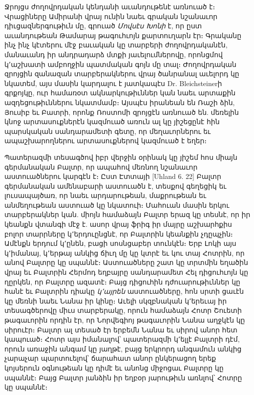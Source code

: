\documentclass{article}
\begin{document}
{Ջրոյցս ժողովրդական կենդանի աւանդութենէ առնուած է։ Վրացիները Ամիրանի վրայ ունին նաեւ գրական նշանաւոր դիւցազներգութիւն մը, գրուած \emph{Մովսէս Խոնի} է, որ ըստ աւանդութեան Թամարայ թագուհւոյն քարտուղարն էր։ Գրականը ինչ ինչ կէտերու մէջ բաւական կը տարբերի ժողովրդականէն, մանաւանդ իր անդրադարձ մտքի յաւելումներովը, որոնցմով կ՚աշխատի ամբողջին պատմական գոյն մը տալ։ Ժողովրդական զրոյցին զանազան տարբերակներու վրայ ծանրանալ աւելորդ կը նկատեմ, այս մասին կարդալու է յատկապէս Dr. Bleichsteinerի գրքոյկը, ուր համառօտ ակնարկութիւններ կան նաեւ արտաքին ազդեցութիւններու նկատմամբ։ Այսպէս իրանեան են Ռաշի ձին, Յուսիբ եւ Բատրի, որոնք Ռոստոմի զրոյցէն առնուած են. մեռելին կնոջ արտասուքներէն կազմուած առուն ալ կը յիշեցընէ հին պարսկական սանդարամետի գետը, որ մեղաւորներու եւ ապաշխարողներու արտասուքներով կազմուած է եղեր։

Պատերազմի տեսագծով իբր վերջին օրինակ կը յիշեմ հոս միայն գերմանական Բալտր, որ ապահով մեռնող նշանաւոր աստուածներու կարգէն է։ Ըստ Էտտայի [Uhland 6. 22] Բալտր գերմանական ամենաբարի աստուածն է, տեսքով գեղեցիկ եւ լուսապայծառ, որ նաեւ արդարութեան, մաքրութեան եւ անմեղութեան աստուած կը նկատուի։ Մահուան մասին երկու տարբերակներ կան. միոյն համաձայն Բալտր երազ կը տեսնէ, որ իր կեանքն վտանգի մէջ է. ասոր վրայ ֆրիգ իր մայրը աշխարհքիս բոլոր տարրները կ՚երդուընցնէ, որ Բալտրին կեանքին չդըպչին։ Ամէնքն երդում կ՚ընեն, բացի սոսնցաբեր տունկէն։ Երբ Լոկի այս կ՚իմանայ, կ՚երթայ անկից ճիւղ մը կը կտրէ եւ կու տայ Հոտրին, որ անով Բալտրը կը սպաննէ։ Աստուածները շատ կը տրտմին եղածին վրայ եւ Բալտրին Հերմոդ եղբայրը սանդարամետ Հել դիցուհւոյն կը ղըրկեն, որ Բալտրը ազատէ։ Բայց դիցուհին դժուարութիւններ կը հանէ եւ Բալտրին դիակը \emph{կ՚այրեն} աստուածները, հոն սրտի ցաւէն կը մեռնի նաեւ Նանա իր կինը։ Աւելի սկզբնական կ՚երեւայ իր տեսագծերովը միւս տարբերակը, որուն համաձայն Հոտր Շուետի թագաւորին որդին էր, որ Նորվեգիոյ թագաւորին Նանա աղջկէն կը սիրուէր։ Բալտր ալ տեսած էր երբեմն Նանա եւ սիրով անոր հետ կապուած։ Հոտր այս իմանալով՝ պատերազմի կ՚ելլէ Բալտրի դէմ, որուն առաջին անգամ կը յաղթէ, բայց երկրորդ անգամուն անկից չարաչար պարտուելով՝ ճարահատ անոր ընկերացող երեք կոյսերուն օգնութեան կը դիմէ եւ անոնց միջոցաւ Բալտրը կը սպաննէ։ Բայց Բալտր յանձին իր եղբօր յարութիւն առնլով՝ Հոտրը կը սպաննէ։}
\clearpage
\subsection{}
\end{document}
